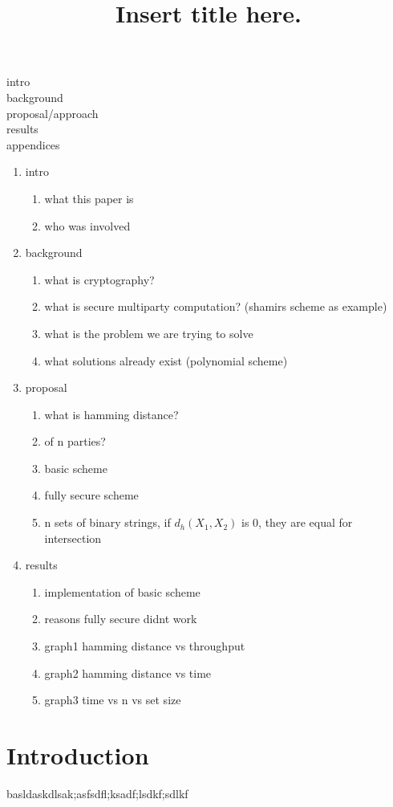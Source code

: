 \documentclass[12pt]{article}
\begin{document}
\title{Insert title here.}


intro
\\background
\\proposal/approach
\\results
\\appendices

\begin{enumerate}
\item intro
	\begin{enumerate}
	\item what this paper is
	\item who was involved
	\end{enumerate}
\item background
	\begin{enumerate}
	\item what is cryptography?
	\item what is secure multiparty computation? (shamirs scheme as example)
	\item what is the problem we are trying to solve
	\item what solutions already exist (polynomial scheme) 
	\end{enumerate}
\item proposal
	\begin{enumerate}
	\item what is hamming distance?
	\item of n parties?
	\item basic scheme
	\item fully secure scheme
	\item n sets of binary strings, if $d_h(X_1,X_2)$ is 0, they are equal for intersection
	\end{enumerate}
\item results
	\begin{enumerate}
	\item implementation of basic scheme
	\item reasons fully secure didnt work
	\item graph1 hamming distance vs throughput
	\item graph2 hamming distance vs time
	\item graph3 time vs n vs set size
	\end{enumerate}
\end{enumerate}
\newpage

\section{Introduction}
basldaskdlsak;asfsdfl;ksadf;lsdkf;sdlkf
\end{document}
